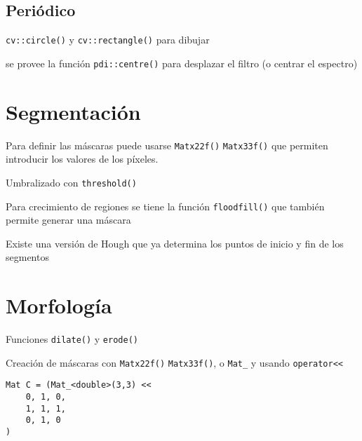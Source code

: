 \documentclass[oneside,a4paper]{book}
\begin{document}
		\section{Periódico}
			\verb|cv::circle()| y \verb|cv::rectangle()| para dibujar

			se provee la función \verb|pdi::centre()| para desplazar el filtro (o centrar el espectro)

	\chapter{Segmentación}
		Para definir las máscaras puede usarse \verb|Matx22f()| \verb|Matx33f()| que permiten introducir los valores de los píxeles.


		Umbralizado con \verb|threshold()|


		Para crecimiento de regiones se tiene la función \verb|floodfill()| que también permite generar una máscara

		Existe una versión de Hough que ya determina los puntos de inicio y fin de los segmentos
	\chapter{Morfología}
		Funciones \verb|dilate()| y \verb|erode()|

		Creación de máscaras con \verb|Matx22f()| \verb|Matx33f()|, o \verb|Mat_| y usando \verb|operator<<|
		\begin{lstlisting}
Mat C = (Mat_<double>(3,3) <<
	0, 1, 0,
	1, 1, 1,
	0, 1, 0
)
		\end{lstlisting}
\end{document}
